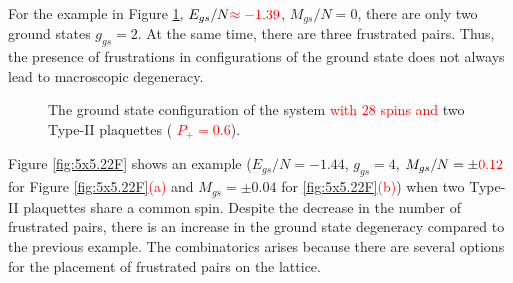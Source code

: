 \documentclass[preprint,12pt]{elsarticle}
\begin{document}
\begin{figure}[H]
	\end{figure}
	
	For the example in Figure \ref{fig:4x7}, $E_{gs}/N\textcolor{red}{\approx-1.39}$, $M_{gs}/N=0$, there are only two ground states $g_{gs}=2$. At the same time, there are three frustrated pairs. Thus, the presence of frustrations in configurations of the ground state does not always lead to macroscopic degeneracy. 
	
	\begin{figure}[H]
		\centering
		\caption{The ground state configuration of the system \textcolor{red}{with 28 spins and} two Type-II plaquettes (\textcolor{red}{  $P_+=0.6$}).}
		\label{fig:4x7}
	\end{figure}
	
	Figure \ref{fig:5x5.22F} shows an example ($E_{gs}/N=-1.44$, $g_{gs}=4$, $M_{gs}/N=\pm \textcolor{red}{0.12}$ for Figure \textcolor{red}{\ref{fig:5x5.22F}(a)} and $M_{gs}=\pm 0.04$ for \textcolor{red}{\ref{fig:5x5.22F}(b)}) when two Type-II plaquettes share a common spin. Despite the decrease in the number of frustrated pairs, there is an increase in the ground state degeneracy compared to the previous example. The combinatorics arises because there are several options for the placement of frustrated pairs on the lattice.
	
\end{document}
